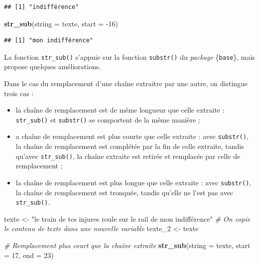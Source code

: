 \documentclass[
  11pt,
]{book}
\newenvironment{Shaded}{\begin{snugshade}}{\end{snugshade}}
\newcommand{\CommentTok}[1]{\textcolor[rgb]{0.56,0.35,0.01}{\textit{#1}}}
\newcommand{\DataTypeTok}[1]{\textcolor[rgb]{0.13,0.29,0.53}{#1}}
\newcommand{\DecValTok}[1]{\textcolor[rgb]{0.00,0.00,0.81}{#1}}
\newcommand{\KeywordTok}[1]{\textcolor[rgb]{0.13,0.29,0.53}{\textbf{#1}}}
\newcommand{\NormalTok}[1]{#1}
\newcommand{\StringTok}[1]{\textcolor[rgb]{0.31,0.60,0.02}{#1}}
\providecommand{\tightlist}{%
  \setlength{\itemsep}{0pt}\setlength{\parskip}{0pt}}
\numberwithin{equation}{section}
\numberwithin{countremarque}{section}
\begin{document}
\begin{lstlisting}
## [1] "indifférence"
\end{lstlisting}

\begin{Shaded}
\begin{Highlighting}[]
\KeywordTok{str\_sub}\NormalTok{(}\DataTypeTok{string =}\NormalTok{ texte, }\DataTypeTok{start =} \DecValTok{{-}16}\NormalTok{)}
\end{Highlighting}
\end{Shaded}

\begin{lstlisting}
## [1] "mon indifférence"
\end{lstlisting}

La fonction \texttt{str\_sub()} s'appuie sur la fonction \texttt{substr()} du \emph{package} \{\texttt{base}\}, mais propose quelques améliorations.

Dans le cas du remplacement d'une chaîne extraitre par une autre, on distingue trois cas :

\begin{itemize}
\tightlist
\item
  la chaîne de remplacement est de même longueur que celle extraite : \texttt{str\_sub()} et \texttt{substr()} se comportent de la même manière ;
\item
  a chaîne de remplacement est plus courte que celle extraite : avec \texttt{substr()}, la chaîne de remplacement est complétée par la fin de celle extraite, tandis qu'avec \texttt{str\_sub()}, la chaîne extraite est retirée et remplacée par celle de remplacement ;
\item
  la chaîne de remplacement est plus longue que celle extraite : avec \texttt{substr()}, la chaîne de remplacement est tronquée, tandis qu'elle ne l'est pas avec \texttt{str\_sub()}.
\end{itemize}

\begin{Shaded}
\begin{Highlighting}[]
\NormalTok{texte \textless{}{-}}\StringTok{ "le train de tes injures roule sur le rail de mon indifférence"}
\CommentTok{\# On copie le contenu de texte dans une nouvelle variable}
\NormalTok{texte\_}\DecValTok{2}\NormalTok{ \textless{}{-}}\StringTok{ }\NormalTok{texte}

\CommentTok{\# Remplacement plus court que la chaîne extraite}
\KeywordTok{str\_sub}\NormalTok{(}\DataTypeTok{string =}\NormalTok{ texte, }\DataTypeTok{start =} \DecValTok{17}\NormalTok{, }\DataTypeTok{end =} \DecValTok{23}\NormalTok{)}
\end{Highlighting}
\end{Shaded}
\end{document}
